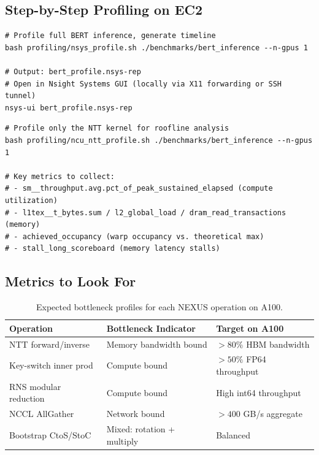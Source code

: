 \documentclass[11pt,letterpaper]{article}
\begin{document}
\subsection{Step-by-Step Profiling on EC2}

\begin{lstlisting}[style=bash, caption=System profiling with Nsight Systems]
# Profile full BERT inference, generate timeline
bash profiling/nsys_profile.sh ./benchmarks/bert_inference --n-gpus 1

# Output: bert_profile.nsys-rep
# Open in Nsight Systems GUI (locally via X11 forwarding or SSH tunnel)
nsys-ui bert_profile.nsys-rep
\end{lstlisting}

\begin{lstlisting}[style=bash, caption=Kernel profiling with Nsight Compute (NTT focus)]
# Profile only the NTT kernel for roofline analysis
bash profiling/ncu_ntt_profile.sh ./benchmarks/bert_inference --n-gpus 1

# Key metrics to collect:
# - sm__throughput.avg.pct_of_peak_sustained_elapsed (compute utilization)
# - l1tex__t_bytes.sum / l2_global_load / dram_read_transactions (memory)
# - achieved_occupancy (warp occupancy vs. theoretical max)
# - stall_long_scoreboard (memory latency stalls)
\end{lstlisting}

\subsection{Metrics to Look For}

\begin{table}[h]
\centering
\begin{tabular}{@{}lll@{}}
\toprule
\textbf{Operation} & \textbf{Bottleneck Indicator} & \textbf{Target on A100} \\
\midrule
NTT forward/inverse & Memory bandwidth bound & $>80\%$ HBM bandwidth \\
Key-switch inner prod & Compute bound & $>50\%$ FP64 throughput \\
RNS modular reduction & Compute bound & High int64 throughput \\
NCCL AllGather & Network bound & $>400$ GB/s aggregate \\
Bootstrap CtoS/StoC & Mixed: rotation + multiply & Balanced \\
\bottomrule
\end{tabular}
\caption{Expected bottleneck profiles for each NEXUS operation on A100.}
\end{table}
\end{document}
